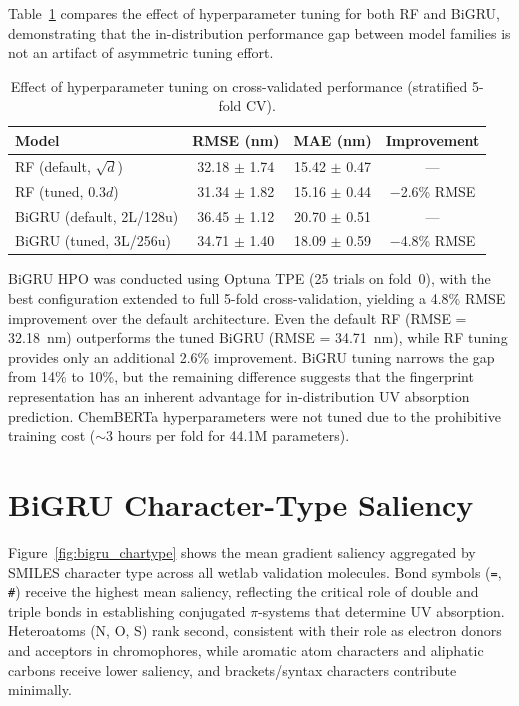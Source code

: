 \documentclass[journal=jcisd8,manuscript=suppinfo]{achemso}
\begin{document}
Table~\ref{tab:tuning_asymmetry} compares the effect of hyperparameter tuning for both RF and BiGRU, demonstrating that the in-distribution performance gap between model families is not an artifact of asymmetric tuning effort.

\begin{table}[htbp]
\centering
\caption{Effect of hyperparameter tuning on cross-validated performance (stratified 5-fold CV).}
\label{tab:tuning_asymmetry}
\begin{tabular}{lccc}
\toprule
\textbf{Model} & \textbf{RMSE (nm)} & \textbf{MAE (nm)} & \textbf{Improvement} \\
\midrule
RF (default, $\sqrt{d}$)         & 32.18 $\pm$ 1.74 & 15.42 $\pm$ 0.47 & --- \\
RF (tuned, $0.3d$)               & 31.34 $\pm$ 1.82 & 15.16 $\pm$ 0.44 & $-$2.6\% RMSE \\
\midrule
BiGRU (default, 2L/128u)         & 36.45 $\pm$ 1.12 & 20.70 $\pm$ 0.51 & --- \\
BiGRU (tuned, 3L/256u) & 34.71 $\pm$ 1.40 & 18.09 $\pm$ 0.59 & $-$4.8\% RMSE \\
\bottomrule
\end{tabular}
\end{table}

BiGRU HPO was conducted using Optuna TPE (25 trials on fold~0), with the best configuration extended to full 5-fold cross-validation, yielding a 4.8\% RMSE improvement over the default architecture.
Even the default RF (RMSE = 32.18~nm) outperforms the tuned BiGRU (RMSE = 34.71~nm), while RF tuning provides only an additional 2.6\% improvement.
BiGRU tuning narrows the gap from 14\% to 10\%, but the remaining difference suggests that the fingerprint representation has an inherent advantage for in-distribution UV absorption prediction.
ChemBERTa hyperparameters were not tuned due to the prohibitive training cost ($\sim$3 hours per fold for 44.1M parameters).


\section{BiGRU Character-Type Saliency}
\label{sec:chartype_saliency}

Figure~\ref{fig:bigru_chartype} shows the mean gradient saliency aggregated by SMILES character type across all wetlab validation molecules.
Bond symbols (\texttt{=}, \texttt{\#}) receive the highest mean saliency, reflecting the critical role of double and triple bonds in establishing conjugated $\pi$-systems that determine UV absorption.
Heteroatoms (N, O, S) rank second, consistent with their role as electron donors and acceptors in chromophores, while aromatic atom characters and aliphatic carbons receive lower saliency, and brackets/syntax characters contribute minimally.
\end{document}
